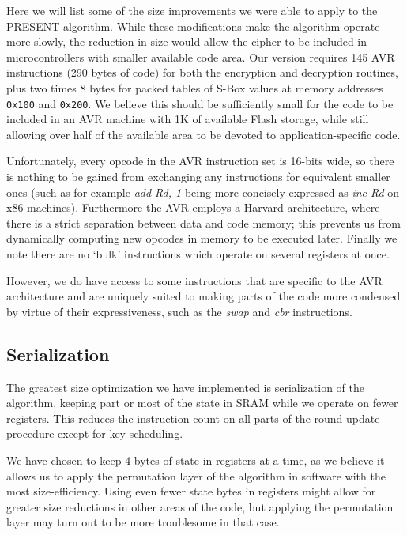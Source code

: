 \documentclass[11pt]{article}
\begin{document}
Here we will list some of the size improvements we were able to apply to the PRESENT algorithm.
While these modifications make the algorithm operate more slowly, the reduction in size would allow the cipher to be included in microcontrollers with smaller available code area.
Our version requires 145  AVR instructions (290 bytes of code) for both the encryption and decryption routines, plus two times 8 bytes for packed tables of S-Box values at memory addresses \texttt{0x100} and \texttt{0x200}.
We believe this should be sufficiently small for the code to be included in an AVR machine with 1K of available Flash storage, while still allowing over half of the available area to be devoted to application-specific code.

Unfortunately, every opcode in the AVR instruction set is 16-bits wide, so there is nothing to be gained from exchanging any instructions for equivalent smaller ones (such as for example \textit{add Rd, 1} being more concisely expressed as \textit{inc Rd} on x86 machines).
Furthermore the AVR employs a Harvard architecture, where there is a strict separation between data and code memory; this prevents us from dynamically computing new opcodes in memory to be executed later.
Finally we note there are no `bulk' instructions which operate on several registers at once.

However, we do have access to some instructions that are specific to the AVR architecture and are uniquely suited to making parts of the code more condensed by virtue of their expressiveness, such as the \textit{swap} and \textit{cbr} instructions.

\subsection{Serialization}
The greatest size optimization we have implemented is serialization of the algorithm, keeping part or most of the state in SRAM while we operate on fewer registers.
This reduces the instruction count on all parts of the round update procedure except for key scheduling.

We have chosen to keep 4 bytes of state in registers at a time, as we believe it allows us to apply the permutation layer of the algorithm in software with the most size-efficiency.
Using even fewer state bytes in registers might allow for greater size reductions in other areas of the code, but applying the permutation layer may turn out to be more troublesome in that case.
\end{document}
